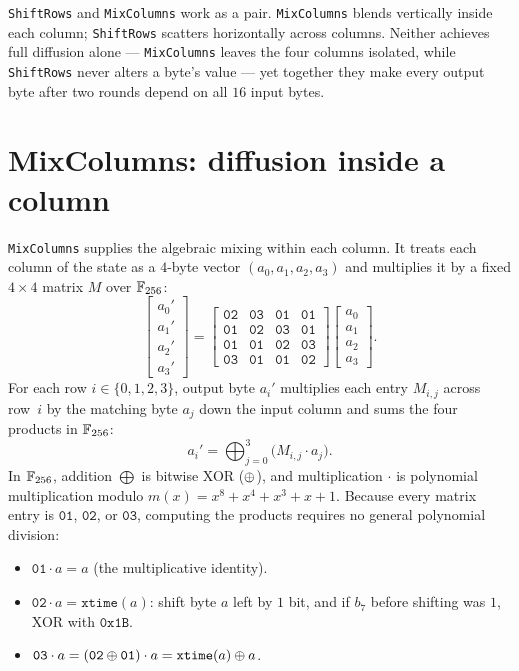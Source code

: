 \begin{intuitionbox}
\texttt{ShiftRows} and \texttt{MixColumns} work as a pair. \texttt{MixColumns}
blends vertically inside each column; \texttt{ShiftRows} scatters horizontally
across columns. Neither achieves full diffusion alone --- \texttt{MixColumns}
leaves the four columns isolated, while \texttt{ShiftRows} never alters a byte's
value --- yet together they make every output byte after two rounds depend on all
$16$ input bytes.
\end{intuitionbox}

\section{MixColumns: diffusion inside a column}
\label{ch12:mixcolumns}

\texttt{MixColumns} supplies the algebraic mixing within each column. It treats
each column of the state as a $4$-byte vector $(a_0,a_1,a_2,a_3)$ and multiplies
it by a fixed $4\times 4$ matrix $M$ over $\mathbb{F}_{256}$:
\[
\begin{bmatrix} a_0' \\ a_1' \\ a_2' \\ a_3' \end{bmatrix}
=
\begin{bmatrix}
\mathtt{02} & \mathtt{03} & \mathtt{01} & \mathtt{01}\\
\mathtt{01} & \mathtt{02} & \mathtt{03} & \mathtt{01}\\
\mathtt{01} & \mathtt{01} & \mathtt{02} & \mathtt{03}\\
\mathtt{03} & \mathtt{01} & \mathtt{01} & \mathtt{02}
\end{bmatrix}
\begin{bmatrix} a_0 \\ a_1 \\ a_2 \\ a_3 \end{bmatrix}.
\]
For each row $i \in \{0,1,2,3\}$, output byte $a_i'$ multiplies each entry
$M_{i,j}$ across row~$i$ by the matching byte $a_j$ down the input column and sums
the four products in $\mathbb{F}_{256}$:
\[
a_i' = \bigoplus_{j=0}^{3} \bigl(M_{i,j} \cdot a_j\bigr).
\]
In $\mathbb{F}_{256}$, addition $\bigoplus$ is bitwise XOR ($\oplus$), and multiplication
$\cdot$ is polynomial multiplication modulo $m(x) = x^8 + x^4 + x^3 + x + 1$.
Because every matrix entry is $\mathtt{01}$, $\mathtt{02}$, or $\mathtt{03}$,
computing the products requires no general polynomial division:
\begin{itemize}
  \item $\mathtt{01} \cdot a = a$ (the multiplicative identity).
  \item $\mathtt{02} \cdot a = \texttt{xtime}(a)$: shift byte $a$ left by $1$ bit, and if $b_7$ before shifting was $1$, XOR with $\mathtt{0x1B}$.
  \item $\mathtt{03} \cdot a = (\mathtt{02} \oplus \mathtt{01}) \cdot a = \texttt{xtime}(a) \oplus a$.
\end{itemize}
